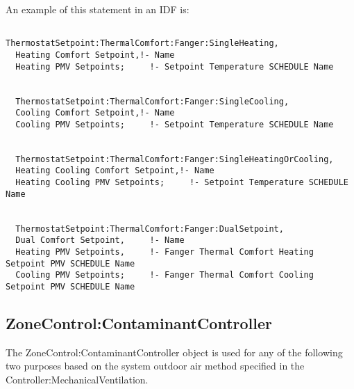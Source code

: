 An example of this statement in an IDF is:

\begin{lstlisting}

ThermostatSetpoint:ThermalComfort:Fanger:SingleHeating,
  Heating Comfort Setpoint,!- Name
  Heating PMV Setpoints;     !- Setpoint Temperature SCHEDULE Name


  ThermostatSetpoint:ThermalComfort:Fanger:SingleCooling,
  Cooling Comfort Setpoint,!- Name
  Cooling PMV Setpoints;     !- Setpoint Temperature SCHEDULE Name


  ThermostatSetpoint:ThermalComfort:Fanger:SingleHeatingOrCooling,
  Heating Cooling Comfort Setpoint,!- Name
  Heating Cooling PMV Setpoints;     !- Setpoint Temperature SCHEDULE Name


  ThermostatSetpoint:ThermalComfort:Fanger:DualSetpoint,
  Dual Comfort Setpoint,     !- Name
  Heating PMV Setpoints,     !- Fanger Thermal Comfort Heating Setpoint PMV SCHEDULE Name
  Cooling PMV Setpoints;     !- Fanger Thermal Comfort Cooling Setpoint PMV SCHEDULE Name
\end{lstlisting}

\subsection{ZoneControl:ContaminantController}\label{zonecontrolcontaminantcontroller}

The ZoneControl:ContaminantController object is used for any of the following two purposes based on the system outdoor air method specified in the Controller:MechanicalVentilation.

